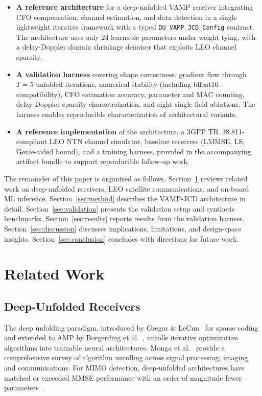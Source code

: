 \documentclass{article}
\begin{document}
\begin{itemize}
  \item \textbf{A reference architecture} for a deep-unfolded VAMP receiver integrating CFO compensation, channel estimation, and data detection in a single lightweight iterative framework with a typed \texttt{DU\_VAMP\_JCD\_Config} contract. The architecture uses only 24 learnable parameters under weight tying, with a delay-Doppler domain shrinkage denoiser that exploits LEO channel sparsity.
  \item \textbf{A validation harness} covering shape correctness, gradient flow through $T=5$ unfolded iterations, numerical stability (including bfloat16 compatibility), CFO estimation accuracy, parameter and MAC counting, delay-Doppler sparsity characterization, and eight single-field ablations. The harness enables reproducible characterization of architectural variants.
  \item \textbf{A reference implementation} of the architecture, a 3GPP TR~38.811-compliant LEO NTN channel simulator, baseline receivers (LMMSE, LS, Genie-aided bound), and a training harness, provided in the accompanying artifact bundle to support reproducible follow-up work.
\end{itemize}

The remainder of this paper is organized as follows. Section~\ref{sec:related} reviews related work on deep-unfolded receivers, LEO satellite communications, and on-board ML inference. Section~\ref{sec:method} describes the VAMP-JCD architecture in detail. Section~\ref{sec:validation} presents the validation setup and synthetic benchmarks. Section~\ref{sec:results} reports results from the validation harness. Section~\ref{sec:discussion} discusses implications, limitations, and design-space insights. Section~\ref{sec:conclusion} concludes with directions for future work.

\section{Related Work}
\label{sec:related}

\subsection{Deep-Unfolded Receivers}

The deep unfolding paradigm, introduced by Gregor \& LeCun~\cite{gregor2010learning} for sparse coding and extended to AMP by Borgerding et al.~\cite{borgerding2017amp}, unrolls iterative optimization algorithms into trainable neural architectures. Monga et al.~\cite{monga2021algorithm} provide a comprehensive survey of algorithm unrolling across signal processing, imaging, and communications. For MIMO detection, deep-unfolded architectures have matched or exceeded MMSE performance with an order-of-magnitude fewer parameters~\cite{he2018learning,samuel2014training}.
\end{document}
